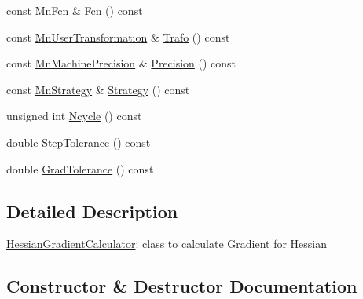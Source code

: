 \begin{DoxyCompactItemize}
\item 
const \mbox{\hyperlink{classROOT_1_1Minuit2_1_1MnFcn}{Mn\+Fcn}} \& \mbox{\hyperlink{classROOT_1_1Minuit2_1_1HessianGradientCalculator_ae23f4348f9a64595c39db48aa48d9e09}{Fcn}} () const
\item 
const \mbox{\hyperlink{classROOT_1_1Minuit2_1_1MnUserTransformation}{Mn\+User\+Transformation}} \& \mbox{\hyperlink{classROOT_1_1Minuit2_1_1HessianGradientCalculator_a4b122eecb0217cab813601572ccbac74}{Trafo}} () const
\item 
const \mbox{\hyperlink{classROOT_1_1Minuit2_1_1MnMachinePrecision}{Mn\+Machine\+Precision}} \& \mbox{\hyperlink{classROOT_1_1Minuit2_1_1HessianGradientCalculator_a256d75d036a5c53b0b679830ca4ac714}{Precision}} () const
\item 
const \mbox{\hyperlink{classROOT_1_1Minuit2_1_1MnStrategy}{Mn\+Strategy}} \& \mbox{\hyperlink{classROOT_1_1Minuit2_1_1HessianGradientCalculator_a407171e2df12fa67e92c0e5b7a97bb8d}{Strategy}} () const
\item 
unsigned int \mbox{\hyperlink{classROOT_1_1Minuit2_1_1HessianGradientCalculator_a234641f72296f007b2d95b514be07138}{Ncycle}} () const
\item 
double \mbox{\hyperlink{classROOT_1_1Minuit2_1_1HessianGradientCalculator_ac66592218817d4cbc8a3be76938b435d}{Step\+Tolerance}} () const
\item 
double \mbox{\hyperlink{classROOT_1_1Minuit2_1_1HessianGradientCalculator_a17febf33fcbeafa556e703d8bbe3d1db}{Grad\+Tolerance}} () const
\end{DoxyCompactItemize}


\subsection{Detailed Description}
\mbox{\hyperlink{classROOT_1_1Minuit2_1_1HessianGradientCalculator}{Hessian\+Gradient\+Calculator}}\+: class to calculate Gradient for Hessian 

\subsection{Constructor \& Destructor Documentation}
\mbox{\label{classROOT_1_1Minuit2_1_1HessianGradientCalculator_af298f780f59cb2be1ac5e676af07f82b}} 
